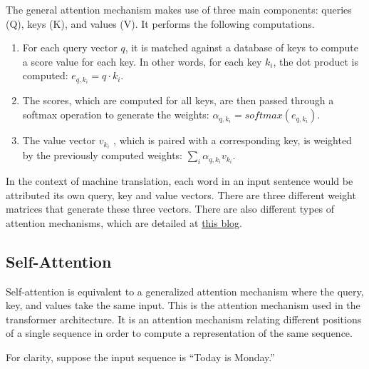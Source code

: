 \documentclass[
]{book}
\providecommand{\tightlist}{%
  \setlength{\itemsep}{0pt}\setlength{\parskip}{0pt}}
\begin{document}
The general attention mechanism makes use of three main components: queries (Q), keys (K), and values (V). It performs the following computations.

\begin{enumerate}
\def\labelenumi{\arabic{enumi}.}
\tightlist
\item
  For each query vector \(q\), it is matched against a database of keys to compute a score value for each key. In other words, for each key \(k_i\), the dot product is computed: \(e_{q,k_i} = q\cdot k_i\).
\item
  The scores, which are computed for all keys, are then passed through a softmax operation to generate the weights: \(\alpha_{q,k_i} = softmax(e_{q,k_i})\).
\item
  The value vector \(v_{k_i}\) , which is paired with a corresponding key, is weighted by the previously computed weights: \(\sum_{i} \alpha_{q,k_i} v_{k_i}\).
\end{enumerate}

In the context of machine translation, each word in an input sentence would be attributed its own query, key and value vectors. There are three different weight matrices that generate these three vectors. There are also different types of attention mechanisms, which are detailed at \href{https://lilianweng.github.io/posts/2018-06-24-attention/}{this blog}.

\hypertarget{self-attention}{%
\subsection{Self-Attention}\label{self-attention}}

Self-attention is equivalent to a generalized attention mechanism where the query, key, and values take the same input. This is the attention mechanism used in the transformer architecture. It is an attention mechanism relating different positions of a single sequence in order to compute a representation of the same sequence.

For clarity, suppose the input sequence is ``Today is Monday.''
\end{document}
